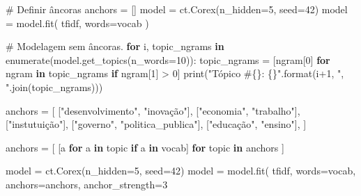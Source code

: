 \documentclass[
  brazilian,
  letterpaper,
  DIV=11,
  numbers=noendperiod]{scrartcl}
\newenvironment{Shaded}{\begin{snugshade}}{\end{snugshade}}
\newcommand{\BuiltInTok}[1]{\textcolor[rgb]{0.00,0.23,0.31}{#1}}
\newcommand{\CommentTok}[1]{\textcolor[rgb]{0.37,0.37,0.37}{#1}}
\newcommand{\ControlFlowTok}[1]{\textcolor[rgb]{0.00,0.23,0.31}{\textbf{#1}}}
\newcommand{\DecValTok}[1]{\textcolor[rgb]{0.68,0.00,0.00}{#1}}
\newcommand{\KeywordTok}[1]{\textcolor[rgb]{0.00,0.23,0.31}{\textbf{#1}}}
\newcommand{\NormalTok}[1]{\textcolor[rgb]{0.00,0.23,0.31}{#1}}
\newcommand{\OperatorTok}[1]{\textcolor[rgb]{0.37,0.37,0.37}{#1}}
\newcommand{\SpecialCharTok}[1]{\textcolor[rgb]{0.37,0.37,0.37}{#1}}
\newcommand{\StringTok}[1]{\textcolor[rgb]{0.13,0.47,0.30}{#1}}
\begin{document}
\begin{Shaded}
\begin{Highlighting}[]
\CommentTok{\# Definir âncoras}
\NormalTok{anchors }\OperatorTok{=}\NormalTok{ []}
\NormalTok{model }\OperatorTok{=}\NormalTok{ ct.Corex(n\_hidden}\OperatorTok{=}\DecValTok{5}\NormalTok{, seed}\OperatorTok{=}\DecValTok{42}\NormalTok{)}
\NormalTok{model }\OperatorTok{=}\NormalTok{ model.fit(}
\NormalTok{    tfidf,}
\NormalTok{    words}\OperatorTok{=}\NormalTok{vocab}
\NormalTok{)}

\CommentTok{\# Modelagem sem âncoras.}
\ControlFlowTok{for}\NormalTok{ i, topic\_ngrams }\KeywordTok{in} \BuiltInTok{enumerate}\NormalTok{(model.get\_topics(n\_words}\OperatorTok{=}\DecValTok{10}\NormalTok{)):}
\NormalTok{    topic\_ngrams }\OperatorTok{=}\NormalTok{ [ngram[}\DecValTok{0}\NormalTok{] }\ControlFlowTok{for}\NormalTok{ ngram }\KeywordTok{in}\NormalTok{ topic\_ngrams }\ControlFlowTok{if}\NormalTok{ ngram[}\DecValTok{1}\NormalTok{] }\OperatorTok{\textgreater{}} \DecValTok{0}\NormalTok{]}
    \BuiltInTok{print}\NormalTok{(}\StringTok{"Tópico \#}\SpecialCharTok{\{\}}\StringTok{: }\SpecialCharTok{\{\}}\StringTok{"}\NormalTok{.}\BuiltInTok{format}\NormalTok{(i}\OperatorTok{+}\DecValTok{1}\NormalTok{, }\StringTok{", "}\NormalTok{.join(topic\_ngrams)))}
    
\NormalTok{anchors }\OperatorTok{=}\NormalTok{ [}
\NormalTok{    [}\StringTok{"desenvolvimento"}\NormalTok{, }\StringTok{"inovação"}\NormalTok{],}
\NormalTok{    [}\StringTok{"economia"}\NormalTok{, }\StringTok{"trabalho"}\NormalTok{],}
\NormalTok{    [}\StringTok{"instutuição"}\NormalTok{],}
\NormalTok{    [}\StringTok{"governo"}\NormalTok{, }\StringTok{"politica\_publica"}\NormalTok{],}
\NormalTok{    [}\StringTok{"educação"}\NormalTok{, }\StringTok{"ensino"}\NormalTok{],}
\NormalTok{]}

\NormalTok{anchors }\OperatorTok{=}\NormalTok{ [}
\NormalTok{    [a }\ControlFlowTok{for}\NormalTok{ a }\KeywordTok{in}\NormalTok{ topic }\ControlFlowTok{if}\NormalTok{ a }\KeywordTok{in}\NormalTok{ vocab]}
    \ControlFlowTok{for}\NormalTok{ topic }\KeywordTok{in}\NormalTok{ anchors}
\NormalTok{]}

\NormalTok{model }\OperatorTok{=}\NormalTok{ ct.Corex(n\_hidden}\OperatorTok{=}\DecValTok{5}\NormalTok{, seed}\OperatorTok{=}\DecValTok{42}\NormalTok{)}
\NormalTok{model }\OperatorTok{=}\NormalTok{ model.fit(}
\NormalTok{    tfidf,}
\NormalTok{    words}\OperatorTok{=}\NormalTok{vocab,}
\NormalTok{    anchors}\OperatorTok{=}\NormalTok{anchors,}
\NormalTok{    anchor\_strength}\OperatorTok{=}\DecValTok{3}
    

\end{Highlighting}
\end{Shaded}
\end{document}
